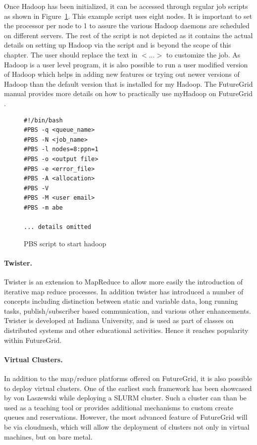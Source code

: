 \documentclass{article}
\begin{document}
Once Hadoop has been initialized, it can be accessed through regular job scripts as shown in Figure~\ref{F:myhadoop-script}. This example script uses eight nodes. It is important to set the processor per node to 1 to assure the various Hadoop daemons are scheduled on different servers. The rest of the script is not depicted as it contains the actual details on setting up Hadoop via the script and is beyond the scope of this chapter. The user should replace the text in $<...>$ to customize the job. As Hadoop is a user level program, it is also possible to run a user modified version of Hadoop which helps in adding new features or trying out newer versions of Hadoop than the default version that is installed for my Hadoop. The FutureGrid manual provides more details on how to practically use myHadoop on FutureGrid \cite{fg-manual-hadoop}.

\begin{figure}[htb]
\begin{center}
\begin{verbatim}
#!/bin/bash
#PBS -q <queue_name>
#PBS -N <job_name>
#PBS -l nodes=8:ppn=1
#PBS -o <output file>
#PBS -e <error_file>
#PBS -A <allocation>
#PBS -V
#PBS -M <user email>
#PBS -m abe

... details omitted
\end{verbatim}
\end{center}
\caption{PBS script to start hadoop}\label{F:myhadoop-script}
\end{figure}

\paragraph{Twister.}

Twister \cite{twsiter} is an extension to MapReduce to allow more easily the introduction of iterative map reduce processes. In addition twister has introduced a number of concepts including distinction between static and variable data, long running tasks, publish/subscriber based communication, and various other enhancements.  Twister is developed at Indiana University, and is used as part of classes on distributed systems and other educational activities. Hence it reaches popularity within FutureGrid.

\paragraph{Virtual Clusters.} In addition to the map/reduce platforms offered on FutureGrid, it is also possible to deploy virtual clusters. One of the earliest such framework has been showcased by von Laszewski \cite{github-futuregrid-vc} while deploying a SLURM cluster. Such a cluster can than be used as a teaching tool or provides additional mechanisms to custom create queues and reservations. However, the most advanced feature of FutureGrid will be via cloudmesh, which will allow the deployment of clusters not only in virtual machines, but on bare metal.
\end{document}
